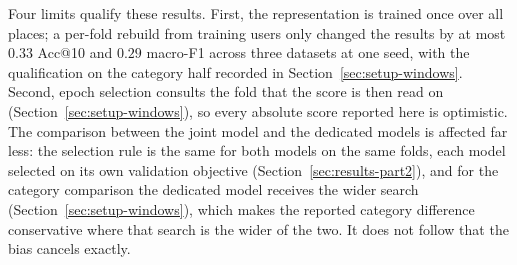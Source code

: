 Four limits qualify these results. First, the representation is trained once over all places; a
per-fold rebuild from training users only changed the results by at most $0.33$ Acc@10 and $0.29$
macro-F1 across three datasets at one seed, with the qualification on the category half recorded in
Section~\ref{sec:setup-windows}. Second, epoch selection consults the fold that the score is
then read on (Section~\ref{sec:setup-windows}), so every absolute score reported here is
optimistic. The comparison between the joint model and the dedicated models is affected far less:
the selection rule is the same for both models on the same folds, each model selected on its own
validation objective (Section~\ref{sec:results-part2}), and for the category comparison the
dedicated model receives the wider search (Section~\ref{sec:setup-windows}), which makes the
reported category difference conservative where that search is the wider of the two. It does not
follow that the bias cancels exactly.
